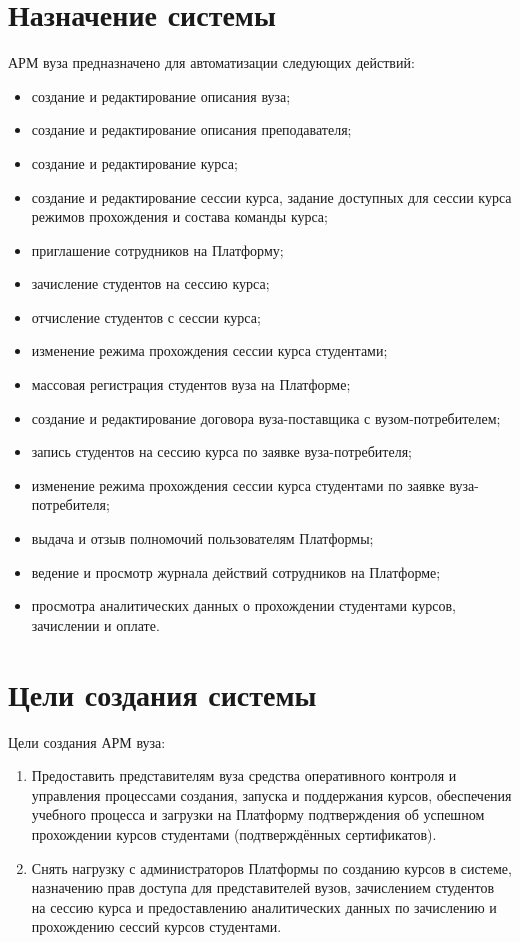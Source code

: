 \section{Назначение системы}
АРМ вуза предназначено для автоматизации следующих действий:

\begin{itemize}
	\item создание и редактирование описания вуза;
	\item создание и редактирование описания преподавателя;
	\item создание и редактирование курса;
	\item создание и редактирование сессии курса, задание доступных для сессии курса режимов прохождения 
	и состава команды курса;
	\item приглашение сотрудников на Платформу;
	\item зачисление студентов на сессию курса;
	\item отчисление студентов с сессии курса;
	\item изменение режима прохождения сессии курса студентами;
	\item массовая регистрация студентов вуза на Платформе;
	\item создание и редактирование договора вуза-поставщика с вузом-потребителем;
	\item запись студентов на сессию курса по заявке вуза-потребителя;
	\item изменение режима прохождения сессии курса студентами по заявке вуза-потребителя;
	\item выдача и отзыв полномочий пользователям Платформы;
	\item ведение и просмотр журнала действий сотрудников на Платформе;
	\item просмотра аналитических данных о прохождении студентами курсов, зачислении и оплате.
\end{itemize}


\section{Цели создания системы}
Цели создания АРМ вуза:
\begin{enumerate}
	\item Предоставить представителям вуза средства оперативного контроля и управления процессами создания, 
	запуска и поддержания курсов, обеспечения учебного процесса и загрузки на Платформу подтверждения об успешном
	прохождении курсов студентами (подтверждённых сертификатов).
	\item Снять нагрузку с администраторов Платформы по созданию курсов в системе, назначению прав доступа 
	для представителей вузов, зачислением студентов на сессию курса и предоставлению аналитических данных по зачислению
	и прохождению сессий курсов студентами.
\end{enumerate}


